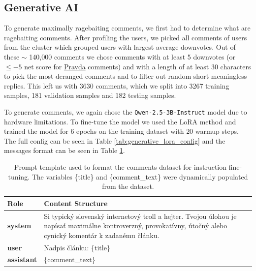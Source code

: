 \documentclass[11pt,a4paper]{article}
\def\pravda{\href{https://pravda.sk}{Pravda}}
\begin{document}
\subsection{Generative AI} \label{sec:method_gen_ai}
To generate maximally ragebaiting comments, we first had to determine what are ragebaiting comments. After profiling the users, we picked all comments of users from the cluster which grouped users with largest average downvotes. Out of these $\sim$ 140,000 comments we chose comments with at least 5 downvotes (or $\leq -5$ net score for \pravda{} comments) and with a length of at least 30 characters to pick the most deranged comments and to filter out random short meaningless replies. This left us with 3630 comments, which we split into 3267 training samples, 181 validation samples and 182 testing samples.

To generate comments, we again chose the \texttt{Qwen-2.5-3B-Instruct} \cite{Yang2024} model due to hardware limitations. To fine-tune the model we used the LoRA method \cite{Hu2021} and trained the model for $6$ epochs on the training dataset with $20$ warmup steps. The full config can be seen in Table \ref{tab:generative_lora_config} and the messages format can be seen in Table \ref{tab:generative_prompts}.

\begin{table}[H]
	\centering
	\small
	\begin{tabular}{@{}lp{12cm}@{}}
		\toprule
		\textbf{Role}      & \textbf{Content Structure}                                                                                                                                       \\ \midrule
		\textbf{system}    & Si typický slovenský internetový troll a hejter. Tvojou úlohou je napísať maximálne kontroverzný, provokatívny, útočný alebo cynický komentár k zadanému článku. \\ \midrule
		\textbf{user}      & \raggedright\arraybackslash Nadpis článku: \{title\}                                                                                                             \\ \midrule
		\textbf{assistant} & \{comment\_text\}                                                                                                                                                \\ \bottomrule
	\end{tabular}
	\caption{Prompt template used to format the comments dataset for instruction fine-tuning. The variables \{title\} and \{comment\_text\} were dynamically populated from the dataset.}
	\label{tab:generative_prompts}
\end{table}
\end{document}
